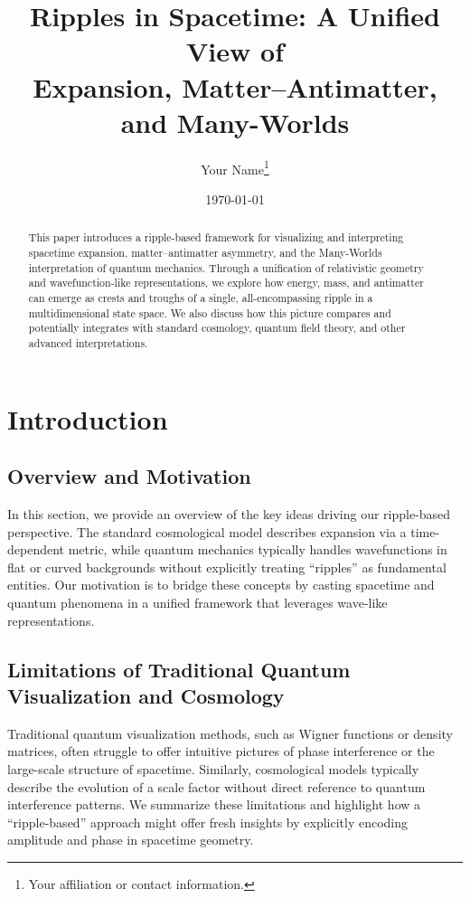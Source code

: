 \documentclass[11pt]{article}
\title{\textbf{Ripples in Spacetime: A Unified View of \\
Expansion, Matter--Antimatter, and Many-Worlds}}
\author{Your Name\thanks{Your affiliation or contact information.}}
\date{\today}
\begin{document}
\maketitle

\begin{abstract}
  This paper introduces a ripple-based framework for visualizing and interpreting 
  spacetime expansion, matter--antimatter asymmetry, and the Many-Worlds 
  interpretation of quantum mechanics. Through a unification of relativistic 
  geometry and wavefunction-like representations, we explore how energy, mass, 
  and antimatter can emerge as crests and troughs of a single, all-encompassing 
  ripple in a multidimensional state space. We also discuss how this picture 
  compares and potentially integrates with standard cosmology, quantum field 
  theory, and other advanced interpretations. 
\end{abstract}

\section{Introduction}
\label{sec:introduction}

\subsection{Overview and Motivation}
\label{subsec:overview-motivation}
In this section, we provide an overview of the key ideas driving our 
ripple-based perspective. The standard cosmological model describes 
expansion via a time-dependent metric, while quantum mechanics typically 
handles wavefunctions in flat or curved backgrounds without explicitly 
treating ``ripples'' as fundamental entities. Our motivation is to bridge 
these concepts by casting spacetime and quantum phenomena in a unified 
framework that leverages wave-like representations.

\subsection{Limitations of Traditional Quantum Visualization and Cosmology}
\label{subsec:limitations}
Traditional quantum visualization methods, such as Wigner functions or 
density matrices, often struggle to offer intuitive pictures of phase 
interference or the large-scale structure of spacetime. Similarly, 
cosmological models typically describe the evolution of a scale factor 
without direct reference to quantum interference patterns. We summarize 
these limitations and highlight how a ``ripple-based'' approach might 
offer fresh insights by explicitly encoding amplitude and phase in 
spacetime geometry.
\end{document}
